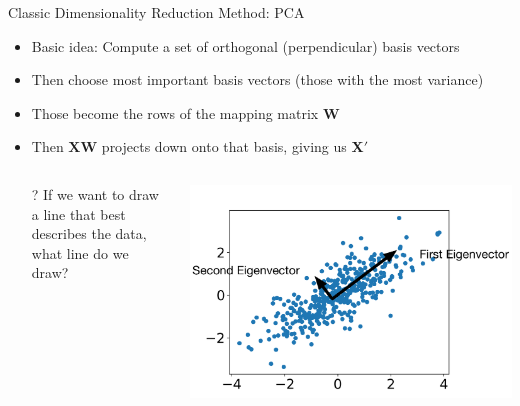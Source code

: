 \documentclass[aspectratio=169]{beamer}
\begin{document}
\begin{frame}{Classic Dimensionality Reduction Method: PCA}

\begin{itemize}
\item Basic idea: Compute a set of orthogonal (perpendicular) basis vectors
\item Then choose most important basis vectors (those with the most variance)
\item Those become the rows of the mapping matrix $\textbf{W}$
\item Then $\textbf{X} \textbf{W}$ projects down onto that basis, giving us \textbf{X$'$}
\end{itemize}
\begin{columns}
\begin{column}{0.5\textwidth}
\begin{itemize}
\item[?] If we want to draw a line that best describes the data, what line do we draw? %
\end{itemize}
\end{column}
\begin{column}{0.5\textwidth}
\includegraphics[width=1\textwidth]{lectDimRed/Data2.pdf}
\end{column}
\end{columns}
\end{frame}
\end{document}
